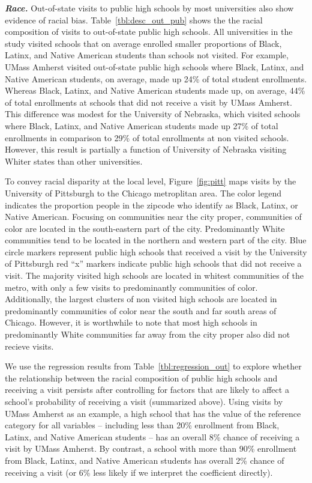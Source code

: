 \documentclass[twoside]{article}
\begin{document}
\textbf{\textit{Race.}} Out-of-state visits to public high schools by most universities also show evidence of racial bias. Table~\ref{tbl:desc_out_pub} shows the the racial composition of visits to out-of-state public high schools. All universities in the study visited schools that on average enrolled smaller proportions of Black, Latinx, and Native American students than schools not visited. For example, UMass Amherst visited out-of-state public high schools where Black, Latinx, and Native American students, on average, made up 24\% of total student enrollments. Whereas Black, Latinx, and Native American students made up, on average, 44\% of total enrollments at schools that did not receive a visit by UMass Amherst. This difference was modest for the University of Nebraska, which visited schools where Black, Latinx, and Native American students made up 27\% of total enrollments in comparison to 29\% of total enrollments at non visited schools. However, this result is partially a function of University of Nebraska visiting Whiter states than other universities.


To convey racial disparity at the local level, Figure~\ref{fig:pitt} maps visits by the University of Pittsburgh to the Chicago metroplitan area.  The color legend indicates the proportion people in the zipcode who identify as Black, Latinx, or Native American. Focusing on communities near the city proper, communities of color are located in the south-eastern part of the city. Predominantly White communities tend to be located in the northern and western part of the city. Blue circle markers represent public high schools that received a visit by the University of Pittsburgh red ``x'' markers indicate public high schools that did not receive a visit. The majority visited high schools are located in whitest communities of the metro, with only a few visits to predominantly communities of color. Additionally, the largest clusters of non visited high schools are located in predominantly communities of color near the south and far south areas of Chicago. However, it is worthwhile to note that most high schools in predominantly White communities far away from the city proper also did not recieve visits.

We use the regression results from Table~\ref{tbl:regression_out} to explore whether the relationship between the racial composition of public high schools and receiving a visit persists after controlling for factors that are likely to affect a school's probability of receiving a visit (summarized above). Using visits by UMass Amherst as an example, a high school that has the value of the reference category for all variables -- including less than 20\% enrollment from Black, Latinx, and Native American students -- has an overall 8\% chance of receiving a visit by UMass Amherst. By contrast, a school with more than 90\% enrollment from Black, Latinx, and Native American students has overall 2\% chance of receiving a visit (or 6\% less likely if we interpret the coefficient directly).
\end{document}
